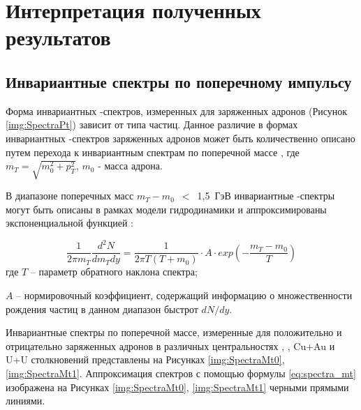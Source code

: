 \chapter{Интерпретация полученных результатов} \label{chapt5}

\section{Инвариантные спектры по поперечному импульсу} \label{sect5_spectra}

Форма инвариантных \pt-спектров, измеренных для заряженных адронов (Рисунок \ref{img:SpectraPt}) зависит от типа частиц.
Данное различие в формах инвариантных \pt-спектров заряженных адронов может быть количественно описано путем перехода к инвариантным спектрам по поперечной массе \mt, где $m_T = \sqrt{m_{0}^{2} + p_{T}^{2}}$, $m_0$ - масса адрона. 

В диапазоне поперечных масс $m_T-m_0$~$<$~1,5~ГэВ инвариантные \mt-спектры могут быть описаны в рамках модели гидродинамики \cite{PPG026, HydroPartonicCascade} и аппроксимированы экспоненциальной функцией \cite{ToutModels}:

\begin{equation}
	\label{eq:spectra_mt}
	\frac{1}{2\pi m_T} \frac{d^2 N}{dm_T dy}=\frac{1}{2\pi T (T+m_0)}\cdot A \cdot exp \left( -\frac{m_T - m_0}{T}\right)
\end{equation}
где $T$ -- параметр обратного наклона спектра;

$A$ -- нормировочный коэффициент, содержащий информацию о множественности рождения частиц в данном диа­пазон быстрот $dN/dy$.

Инвариантные спектры по поперечной массе, измеренные для положительно и отрицательно заряженных адронов в различных центральностях \pal, \heau, Cu+Au и U+U столкновений представлены на Рисунках \ref{img:SpectraMt0}, \ref{img:SpectraMt1}. Аппроксимация спектров с помощью формулы \ref{eq:spectra_mt} изображена на Рисунках \ref{img:SpectraMt0}, \ref{img:SpectraMt1} черными прямыми линиями.

